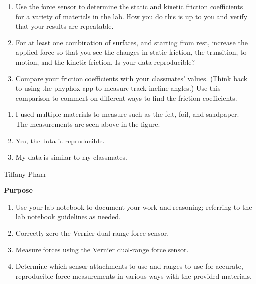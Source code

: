\documentclass[idxtotoc,hyperref,openany]{labbook} %
\begin{document}

\begin{enumerate}
    \item Use the force sensor to determine the static and kinetic friction coefficients for a variety of materials in the lab. How you do this is up to you and verify that your results are repeatable.
    \item For at least one combination of surfaces, and starting from rest, increase the applied force so that you see the changes in static friction, the transition, to motion, and the kinetic friction. Is your data reproducible?
    \item Compare your friction coefficients with your classmates’ values. (Think back to using the phyphox app to measure track incline angles.) Use this comparison to comment on different ways to find the friction coefficients.
\end{enumerate}


\begin{enumerate}
    \item I used multiple materials to measure such as the felt, foil, and sandpaper. The measurements are seen above in the figure.
    \item Yes, the data is reproducible.
    \item My data is similar to my classmates.
\end{enumerate}



\vspace{-5mm}
Tiffany Pham

\textbf{Purpose}
\begin{enumerate}
    \item Use your lab notebook to document your work and reasoning; referring to the lab notebook guidelines as needed.
    \item Correctly zero the Vernier dual-range force sensor.
    \item Measure forces using the Vernier dual-range force sensor.
    \item Determine which sensor attachments to use and ranges to use for accurate, reproducible force measurements in various ways with the provided materials.
\end{enumerate}
\end{document}

